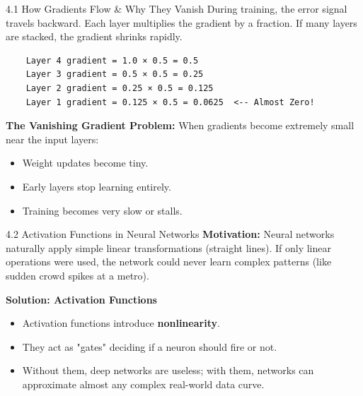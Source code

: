 \documentclass[aspectratio=169]{beamer}
\begin{document}

\begin{frame}[fragile]{4.1 How Gradients Flow \& Why They Vanish}
    \small
    During training, the error signal travels backward. Each layer multiplies the gradient by a fraction. If many layers are stacked, the gradient shrinks rapidly.

    \begin{verbatim}
    Layer 4 gradient = 1.0 × 0.5 = 0.5
    Layer 3 gradient = 0.5 × 0.5 = 0.25
    Layer 2 gradient = 0.25 × 0.5 = 0.125
    Layer 1 gradient = 0.125 × 0.5 = 0.0625  <-- Almost Zero!
    \end{verbatim}

    \textbf{The Vanishing Gradient Problem:}
    When gradients become extremely small near the input layers:
    \begin{itemize}
        \item Weight updates become tiny.
        \item Early layers stop learning entirely.
        \item Training becomes very slow or stalls.
    \end{itemize}
\end{frame}

\begin{frame}{4.2 Activation Functions in Neural Networks}
    \textbf{Motivation:}
    Neural networks naturally apply simple linear transformations (straight lines). If only linear operations were used, the network could never learn complex patterns (like sudden crowd spikes at a metro).

    \vspace{0.3cm}
    \textbf{Solution: Activation Functions}
    \begin{itemize}
        \item Activation functions introduce \textbf{nonlinearity}.
        \item They act as "gates" deciding if a neuron should fire or not.
        \item Without them, deep networks are useless; with them, networks can approximate almost any complex real-world data curve.
    \end{itemize}
\end{frame}
\end{document}
